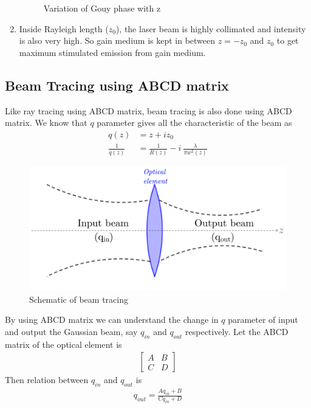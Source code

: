 \documentclass[11pt,a4paper]{article}
\numberwithin{equation}{section}
\begin{document}
\begin{enumerate}
	\begin{figure}[H]
		\centering
		\scalebox{0.7}{}
		\caption{Variation of Gouy phase with z}
		\label{fig:gouy}
	\end{figure}
	
	\item 
	Inside Rayleigh length ($z_0$), the laser beam is highly collimated and intensity is also very high. So gain medium is kept in between $z=-z_0$ and $z_0$ to get maximum stimulated emission from gain medium.
\end{enumerate}


\subsection{Beam Tracing using ABCD matrix}
Like ray tracing using ABCD matrix, beam tracing is also done using ABCD matrix. We know that $q$ parameter gives all the characteristic of the beam as 
\begin{align*}
	q(z) &= z + iz_0\\
	\frac{1}{q(z)} &= \frac{1}{R(z)} - i\: \frac{\lambda}{\pi w^2(z)}
\end{align*}
\begin{figure}[H]
	\centering
	\includegraphics[width=0.5\linewidth]{"beam tracing"}
	\caption{Schematic of beam tracing}
	\label{fig:beam-tracing}
\end{figure}

By using ABCD matrix we can understand the change in $q$ parameter of input and output the Gaussian beam, say $q_{in}$ and $q_{out}$ respectively. Let the ABCD matrix of the optical element is 
\begin{align}
	\begin{bmatrix}
		A&B\\
		C&D
	\end{bmatrix}
\end{align}
Then relation between $q_{in}$ and $q_{out}$ is
\begin{align}
	q_{out}= \frac{Aq_{in}+B}{Cq_{in}+D}
\end{align}
\end{document}
